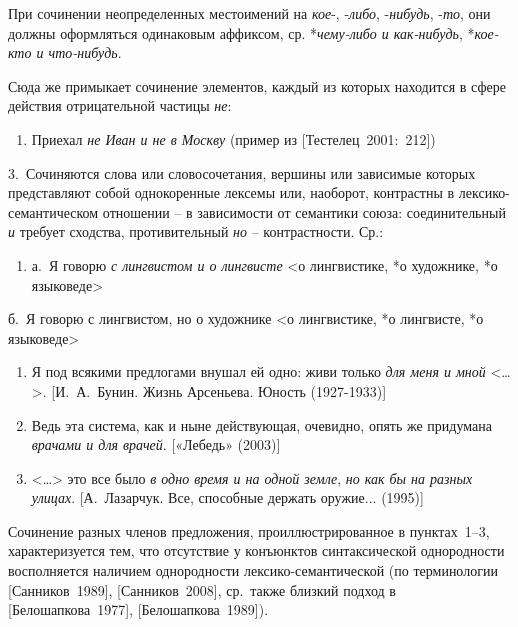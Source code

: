 При сочинении неопределенных местоимений на \emph{кое}-, -\emph{либо},
-\emph{нибудь}, -\emph{то}, они должны оформляться одинаковым аффиксом,
ср. *\emph{чему-либо и как-нибудь}, *\emph{кое-кто и что-нибудь}.

Сюда же примыкает сочинение элементов, каждый из которых находится в
сфере действия отрицательной частицы \emph{не}:

\begin{enumerate}
\def\labelenumi{(\arabic{enumi})}
\setcounter{enumi}{37}
\item
  Приехал \emph{не Иван и не в Москву} (пример из
  {[}Тестелец~2001:~212{]})
\end{enumerate}

3.~Сочиняются слова или словосочетания, вершины или зависимые которых
представляют собой однокоренные лексемы или, наоборот, контрастны в
лексико-семантическом отношении -- в зависимости от семантики союза:
соединительный \emph{и} требует сходства, противительный \emph{но} --
контрастности. Ср.:

\begin{enumerate}
\def\labelenumi{(\arabic{enumi})}
\setcounter{enumi}{38}
\item
  а.~Я говорю \emph{с лингвистом и о лингвисте} \textless о лингвистике,
  *о художнике, *о языковеде\textgreater{}
\end{enumerate}

б.~Я говорю с лингвистом, но о художнике \textless*о лингвистике, *о
лингвисте, *о языковеде\textgreater{}

\begin{enumerate}
\def\labelenumi{(\arabic{enumi})}
\setcounter{enumi}{39}
\item
  Я под всякими предлогами внушал ей одно: живи только \emph{для меня и
  мной} \textless\ldots\textgreater. {[}И.~А.~Бунин. Жизнь Арсеньева.
  Юность (1927-1933){]}
\item
  Ведь эта система, как и ныне действующая, очевидно, опять же придумана
  \emph{врачами и для врачей}. {[}«Лебедь» (2003){]}
\item
  \textless\ldots\textgreater{} это все было \emph{в одно время и на
  одной земле}, \emph{но как бы на разных улицах}. {[}А.~Лазарчук. Все,
  способные держать оружие... (1995){]}
\end{enumerate}

Сочинение разных членов предложения, проиллюстрированное в пунктах~1--3,
характеризуется тем, что отсутствие у конъюнктов синтаксической
однородности восполняется наличием однородности лексико-семантической
(по терминологии {[}Санников~1989{]}, {[}Санников~2008{]}, ср.~также
близкий подход в {[}Белошапкова~1977{]}, {[}Белошапкова~1989{]}).

